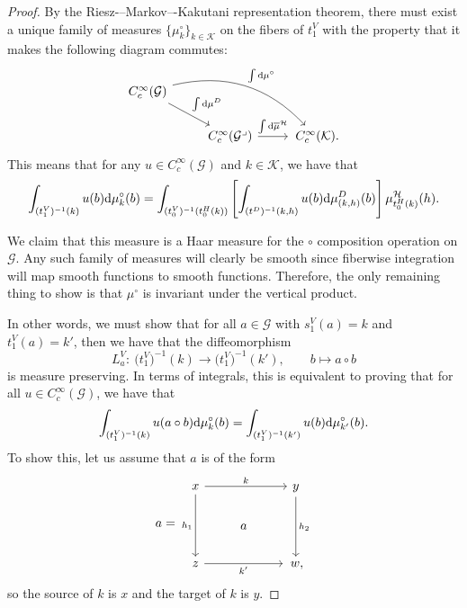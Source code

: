 \documentclass[pdftex]{sigma}
\numberwithin{equation}{section}
\theoremstyle{definition}
\newcommand{\CG}{\mathcal{G}}
\newcommand{\CH}{\mathcal{H}}
\newcommand{\CK}{\mathcal{K}}
\newcommand{\inv}{^{-1}}
\begin{document}
  \begin{proof}
       By the Riesz-–Markov–-Kakutani representation theorem, there must exist a unique family of measures $ \{ \mu_k^\circ \}_{k \in \CK} $ on the fibers of $ t^V_1 $ with the property that it makes the following diagram commutes:
    \[
    \begin{tikzcd}
         C^\infty_c(\CG) \arrow[rrd, bend left, "\int {\rm d} \mu^\circ"] \arrow[dr, "\int {\rm d} \mu^D"] & & \\
      & C^\infty_c(\CG^\lrcorner)  \arrow[r, "\int {\rm d}\overline{\mu}^\CH"] &\, C^\infty_c(\CK).
    \end{tikzcd}
    \]
    This means that for any $ u \in C^\infty_c(\CG) $ and $ k \in \CK $, we have that
    \[
    \int_{(t^V_1)\inv(k)} u(b) {\rm d} \mu^\circ_{k}(b) =
    \int_{(t^V_0) \inv(t^H_0(k))} \left[\int_{(t^D)\inv(k,h)} u(b) {\rm d} \mu^D_{(k,h)}(b) \right] \mu^\CH_{t^H_0(k)} (h).
    \]

       We claim that this measure is a Haar measure for the $ \circ $ composition operation on $ \CG $. Any such family of measures will clearly be smooth since fiberwise integration will map smooth functions to smooth functions.
    Therefore, the only remaining thing to show is that $ \mu^\circ $ is invariant under the vertical product.

    In other words, we must show that for all $ a \in \CG $ with $ s^V_1(a) = k $ and $ t^V_1(a) = k' $, then we have that the diffeomorphism
    \[ L^V_a \colon\ \big(t^V_1\big)\inv(k) \to \big(t^V_1\big)\inv(k'), \qquad b \mapsto a \circ b \]
    is measure preserving.
    In terms of integrals, this is equivalent to proving that for all $ u \in C^\infty_c(\CG) $, we have that
    \[
     \int_{(t^V_1)\inv(k)} u(a \circ b) {\rm d} \mu_k^\circ(b) = \int_{(t^V_1)\inv(k')} u( b) {\rm d} \mu_{k'}^\circ (b).
    \]
    To show this, let us assume that $ a $ is of the form
\[
a = \begin{tikzcd}
   x \arrow[rr, "k"] \arrow[dd, "h_1", swap] & & y \arrow[dd, "h_2"] \\
   & a & \\
   z\arrow[rr, "k'", swap] & & \,w,
\end{tikzcd}
\]
so the source of $ k $ is $ x $ and the target of $ k $ is $ y $.


\end{proof}
\end{document}
